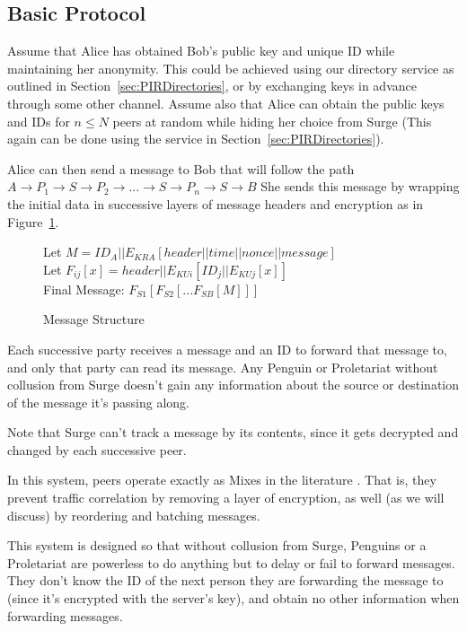 \documentclass[twocolumn,11pt,english]{article}
\begin{document}
\subsection{Basic Protocol}
Assume that Alice has obtained Bob's public key and unique ID while maintaining her anonymity. This could be achieved using our directory service as outlined in Section~\ref{sec:PIRDirectories}, or by exchanging keys in advance through some other channel. Assume also that Alice can obtain the public keys and IDs for $n \le N$ peers at random while hiding her choice from Surge (This again can be done using the service in Section~\ref{sec:PIRDirectories}).

Alice can then send a message to Bob that will follow the path 
\\$A \rightarrow P_1 \rightarrow S \rightarrow P_2 \rightarrow ... \rightarrow S \rightarrow P_n \rightarrow S \rightarrow B$ 
She sends this message by wrapping the initial data in successive layers of message headers and encryption as in Figure~\ref{messageStructure}.
\\
\begin{figure}[h]
Let \scriptsize$M = ID_A||E_{KRA}[ header || time || nonce || message ]$
\normalsize
\\Let \scriptsize$F_{ij}[x] = header||E_{KUi}[ ID_j || E_{KUj}[ x ] ]$
\normalsize
\\
Final Message: $F_{S1}[F_{S2}[...F_{SB}[ M ]]]$
\caption{Message Structure}
\label{messageStructure}
\end{figure}

Each successive party receives a message and an ID to forward that message to, and only that party can read its message. Any Penguin or Proletariat without collusion from Surge doesn't gain any information about the source or destination of the message it's passing along. 

Note that Surge can't track a message by its contents, since it gets decrypted and changed by each successive peer. 

In this system, peers operate exactly as Mixes in the literature \cite{chaum-mix} . That is, they prevent traffic correlation by removing a layer of encryption, as well (as we will discuss) by reordering and batching messages. 

This system is designed so that without collusion from Surge, Penguins or a Proletariat are powerless to do anything but to delay or fail to forward messages. They don't know the ID of the next person they are forwarding the message to (since it's encrypted with the server's key), and obtain no other information when forwarding messages. 
\end{document}
